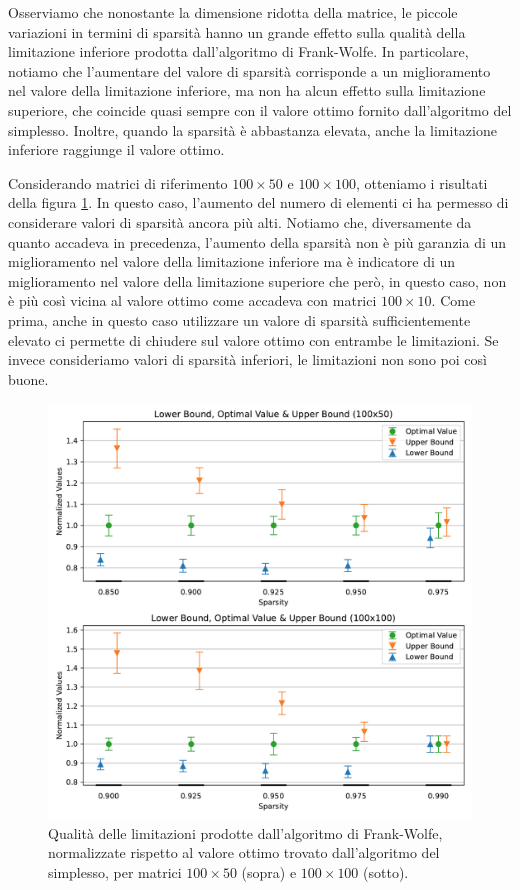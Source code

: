 \noindent Osserviamo che nonostante la dimensione ridotta della matrice, le piccole variazioni in termini di sparsità
hanno un grande effetto sulla qualità della limitazione inferiore prodotta dall'algoritmo di Frank-Wolfe. In
particolare, notiamo che l'aumentare del valore di sparsità corrisponde a un miglioramento nel valore della limitazione
inferiore, ma non ha alcun effetto sulla limitazione superiore, che coincide quasi sempre con il valore ottimo fornito
dall'algoritmo del simplesso. Inoltre, quando la sparsità è abbastanza elevata, anche la limitazione inferiore raggiunge
il valore ottimo.

Considerando matrici di riferimento \( 100\times50 \) e \( 100\times100 \), otteniamo i risultati della figura
\ref{fig:quality_small2}. In questo caso, l'aumento del numero di elementi ci ha permesso di considerare valori di
sparsità ancora più alti. Notiamo che, diversamente da quanto accadeva in precedenza, l'aumento
della sparsità non è più garanzia di un miglioramento nel valore della limitazione inferiore ma è indicatore di un
miglioramento nel valore della limitazione superiore che però, in questo caso, non è più così vicina al valore ottimo
come accadeva con matrici \( 100\times 10 \). Come prima, anche in questo caso utilizzare un valore di sparsità
sufficientemente elevato ci permette di chiudere sul valore ottimo con entrambe le limitazioni. Se invece consideriamo
valori di sparsità inferiori, le limitazioni non sono poi così buone.
\begin{figure}[h]
    \centering
    \includegraphics[scale=.787]{assets/figures/Small23.pdf}
    \caption{Qualità delle limitazioni prodotte dall'algoritmo di Frank-Wolfe, normalizzate rispetto al valore ottimo
    trovato dall'algoritmo del simplesso, per matrici \( 100\times 50 \) (sopra) e \( 100\times100 \) (sotto).}
    \label{fig:quality_small2}
\end{figure}

